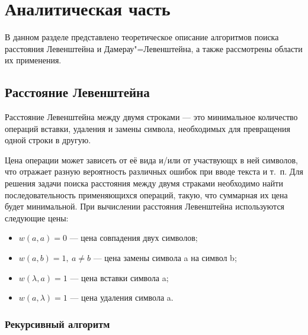\chapter{Аналитическая часть}

В данном разделе представлено теоретическое описание алгоритмов поиска
расстояния Левенштейна и Дамерау"=Левенштейна, а также рассмотрены области их
применения.

\section{Расстояние Левенштейна}

Расстояние Левенштейна\cite{distances} между двумя строками --- это минимальное
количество операций вставки, удаления и замены символа, необходимых для
превращения одной строки в другую.

Цена операции может зависеть от её вида и/или от участвующх в ней символов, что
отражает разную вероятность различных ошибок при вводе текста и т.~п. Для
решения задачи поиска расстояния между двумя страками необходимо найти
последовательность применяющихся операций, такую, что суммарная их цена будет
минимальной. При вычислении расстояния Левенштейна используются следующие цены:

\begin{itemize}
    \item $w(a, a) = 0$ --- цена совпадения двух символов;
    \item $w(a, b) = 1,~a \neq b$ --- цена замены символа a на символ b;
    \item $w(\lambda, a) = 1$ --- цена вставки символа a;
    \item $w(a, \lambda) = 1$ --- цена удаления символа a.
\end{itemize}

\subsection{Рекурсивный алгоритм}

